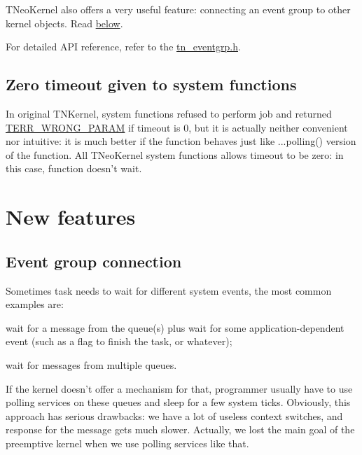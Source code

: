 T\+Neo\+Kernel also offers a very useful feature\+: connecting an event group to other kernel objects. Read \hyperlink{tnkernel_diff_tnkernel_new_features__eventgrp_conn}{below}.

For detailed A\+P\+I reference, refer to the {\ttfamily \hyperlink{tn__eventgrp_8h}{tn\+\_\+eventgrp.\+h}}.\hypertarget{tnkernel_diff_tnkernel_diff_zero_timeout}{}\subsection{Zero timeout given to system functions}\label{tnkernel_diff_tnkernel_diff_zero_timeout}
In original T\+N\+Kernel, system functions refused to perform job and returned {\ttfamily \hyperlink{tn__oldsymbols_8h_a35ec519d54f884d84c5814f49f00a22b}{T\+E\+R\+R\+\_\+\+W\+R\+O\+N\+G\+\_\+\+P\+A\+R\+A\+M}} if {\ttfamily timeout} is 0, but it is actually neither convenient nor intuitive\+: it is much better if the function behaves just like {\ttfamily ...polling()} version of the function. All T\+Neo\+Kernel system functions allows timeout to be zero\+: in this case, function doesn't wait.\hypertarget{tnkernel_diff_tnkernel_new_features}{}\section{New features}\label{tnkernel_diff_tnkernel_new_features}
\hypertarget{tnkernel_diff_tnkernel_new_features__eventgrp_conn}{}\subsection{Event group connection}\label{tnkernel_diff_tnkernel_new_features__eventgrp_conn}
Sometimes task needs to wait for different system events, the most common examples are\+:


\begin{DoxyItemize}
\item wait for a message from the queue(s) plus wait for some application-\/dependent event (such as a flag to finish the task, or whatever);
\item wait for messages from multiple queues.
\end{DoxyItemize}

If the kernel doesn't offer a mechanism for that, programmer usually have to use polling services on these queues and sleep for a few system ticks. Obviously, this approach has serious drawbacks\+: we have a lot of useless context switches, and response for the message gets much slower. Actually, we lost the main goal of the preemptive kernel when we use polling services like that.

